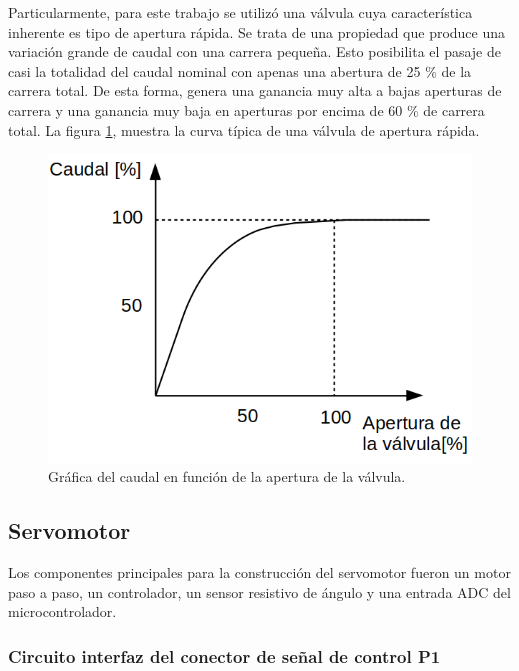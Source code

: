 Particularmente, para este trabajo se utilizó una válvula cuya característica inherente es tipo de apertura rápida. Se trata de una propiedad que produce una variación grande de caudal con una carrera pequeña. Esto posibilita el pasaje de casi la totalidad del caudal nominal con apenas una abertura de 25 \% de la carrera total.
De esta forma, genera una ganancia muy alta a bajas aperturas de carrera y una ganancia muy baja en aperturas por encima de 60 \% de carrera total. 
La figura \ref{fig:grafica caudal vs. apertura de valvula}, muestra la curva típica de una válvula de apertura rápida.
\begin{figure}[h]
\centering
\includegraphics[scale=.60]{./Figures/funcion-valvula.png}
\caption{Gráfica del caudal en función de la apertura de la válvula.}
\label{fig:grafica caudal vs. apertura de valvula}
\end{figure}

\vspace{2cm}
\subsection{Servomotor}
\label{subsec:Servomotor}

Los componentes principales para la construcción del servomotor fueron un motor paso a paso, un controlador, un sensor resistivo de ángulo y una entrada ADC del microcontrolador.


\subsubsection{Circuito interfaz del conector de señal de control P1}

